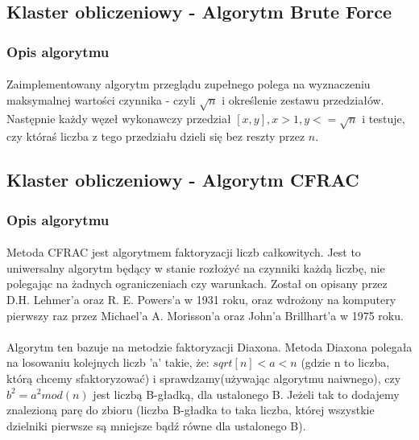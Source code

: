 \documentclass{article}
\begin{document}
\subsection{Klaster obliczeniowy - Algorytm Brute Force}
\subsubsection{Opis algorytmu}
\paragraph{}Zaimplementowany algorytm przeglądu zupełnego polega na wyznaczeniu maksymalnej wartości czynnika - czyli $\sqrt{n}$ i określenie zestawu przedziałów. Następnie każdy węzeł wykonawczy przedział $[x,y], x > 1, y <= \sqrt{n}$ i testuje, czy któraś liczba z tego przedziału dzieli się bez reszty przez $n$.


\subsection{Klaster obliczeniowy - Algorytm CFRAC}
\subsubsection{Opis algorytmu\cite{cfracwiki}\cite{cfracinz}}
\paragraph{}Metoda CFRAC  jest algorytmem faktoryzacji liczb całkowitych. Jest to uniwersalny algorytm będący w stanie rozłożyć na czynniki każdą liczbę, nie polegając na żadnych ograniczeniach czy warunkach. Został on opisany przez D.H. Lehmer'a oraz R. E. Powers'a w 1931 roku, oraz wdrożony na komputery pierwszy raz przez Michael'a A. Morisson'a oraz John'a Brillhart'a w 1975 roku.

\paragraph{}Algorytm ten bazuje na metodzie faktoryzacji Diaxona. Metoda Diaxona polegała na losowaniu kolejnych liczb 'a' takie, że:
$sqrt[n] < a < n$ (gdzie n to liczba, którą chcemy sfaktoryzować)
i sprawdzamy(używając algorytmu naiwnego), czy $b^2 = a^2mod(n)$ jest liczbą B-gładką, dla ustalonego B. Jeżeli tak to dodajemy znalezioną parę do zbioru (liczba B-gładka to taka liczba, której wszystkie dzielniki pierwsze są mniejsze bądź równe dla ustalonego B).
\end{document}
